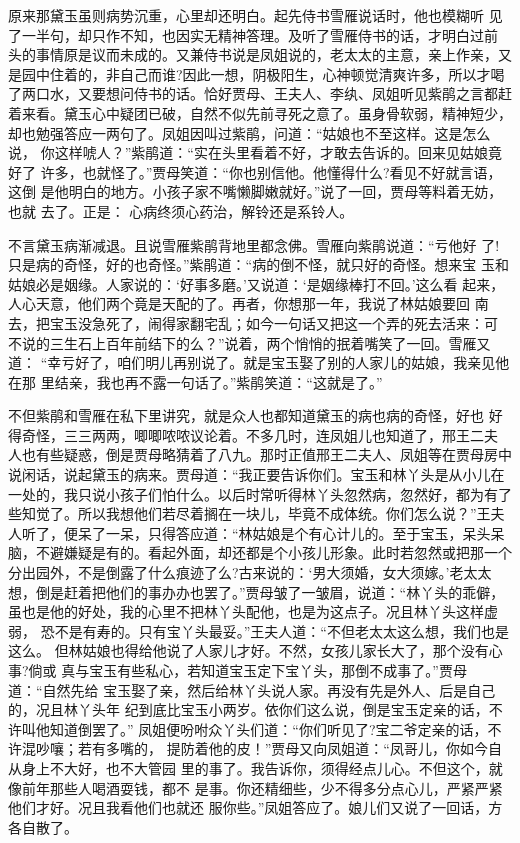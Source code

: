 原来那黛玉虽则病势沉重，心里却还明白。起先侍书雪雁说话时，他也模糊听
见了一半句，却只作不知，也因实无精神答理。及听了雪雁侍书的话，才明白过前
头的事情原是议而未成的。又兼侍书说是凤姐说的，老太太的主意，亲上作亲，又
是园中住着的，非自己而谁?因此一想，阴极阳生，心神顿觉清爽许多，所以才喝
了两口水，又要想问侍书的话。恰好贾母、王夫人、李纨、凤姐听见紫鹃之言都赶
着来看。黛玉心中疑团已破，自然不似先前寻死之意了。虽身骨软弱，精神短少，
却也勉强答应一两句了。凤姐因叫过紫鹃，问道：“姑娘也不至这样。这是怎么说，
你这样唬人？”紫鹃道：“实在头里看着不好，才敢去告诉的。回来见姑娘竟好了
许多，也就怪了。”贾母笑道：“你也别信他。他懂得什么?看见不好就言语，这倒
是他明白的地方。小孩子家不嘴懒脚嫩就好。”说了一回，贾母等料着无妨，也就
去了。正是：
心病终须心药治，解铃还是系铃人。

不言黛玉病渐减退。且说雪雁紫鹃背地里都念佛。雪雁向紫鹃说道：“亏他好
了!只是病的奇怪，好的也奇怪。”紫鹃道：“病的倒不怪，就只好的奇怪。想来宝
玉和姑娘必是姻缘。人家说的：‘好事多磨。’又说道：‘是姻缘棒打不回。’这么看
起来，人心天意，他们两个竟是天配的了。再者，你想那一年，我说了林姑娘要回
南去，把宝玉没急死了，闹得家翻宅乱；如今一句话又把这一个弄的死去活来：可
不说的三生石上百年前结下的么？”说着，两个悄悄的抿着嘴笑了一回。雪雁又道：
“幸亏好了，咱们明儿再别说了。就是宝玉娶了别的人家儿的姑娘，我亲见他在那
里结亲，我也再不露一句话了。”紫鹃笑道：“这就是了。”

不但紫鹃和雪雁在私下里讲究，就是众人也都知道黛玉的病也病的奇怪，好也
好得奇怪，三三两两，唧唧哝哝议论着。不多几时，连凤姐儿也知道了，邢王二夫
人也有些疑惑，倒是贾母略猜着了八九。那时正值邢王二夫人、凤姐等在贾母房中
说闲话，说起黛玉的病来。贾母道：“我正要告诉你们。宝玉和林丫头是从小儿在
一处的，我只说小孩子们怕什么。以后时常听得林丫头忽然病，忽然好，都为有了
些知觉了。所以我想他们若尽着搁在一块儿，毕竟不成体统。你们怎么说？”王夫
人听了，便呆了一呆，只得答应道：“林姑娘是个有心计儿的。至于宝玉，呆头呆
脑，不避嫌疑是有的。看起外面，却还都是个小孩儿形象。此时若忽然或把那一个
分出园外，不是倒露了什么痕迹了么?古来说的：‘男大须婚，女大须嫁。’老太太
想，倒是赶着把他们的事办办也罢了。”贾母皱了一皱眉，说道：“林丫头的乖僻，
虽也是他的好处，我的心里不把林丫头配他，也是为这点子。况且林丫头这样虚弱，
恐不是有寿的。只有宝丫头最妥。”王夫人道：“不但老太太这么想，我们也是这么。
但林姑娘也得给他说了人家儿才好。不然，女孩儿家长大了，那个没有心事?倘或
真与宝玉有些私心，若知道宝玉定下宝丫头，那倒不成事了。”贾母道：“自然先给
宝玉娶了亲，然后给林丫头说人家。再没有先是外人、后是自己的，况且林丫头年
纪到底比宝玉小两岁。依你们这么说，倒是宝玉定亲的话，不许叫他知道倒罢了。”
凤姐便吩咐众丫头们道：“你们听见了?宝二爷定亲的话，不许混吵嚷；若有多嘴的，
提防着他的皮！”贾母又向凤姐道：“凤哥儿，你如今自从身上不大好，也不大管园
里的事了。我告诉你，须得经点儿心。不但这个，就像前年那些人喝酒耍钱，都不
是事。你还精细些，少不得多分点心儿，严紧严紧他们才好。况且我看他们也就还
服你些。”凤姐答应了。娘儿们又说了一回话，方各自散了。

